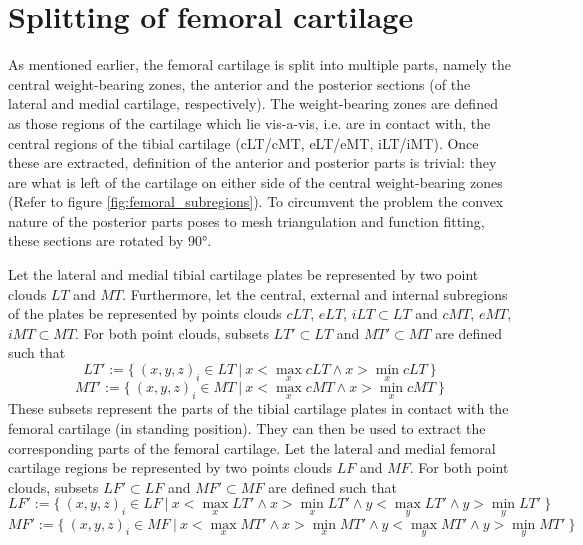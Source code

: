 \section{Splitting of femoral cartilage}
\label{sec:Splitting}
As mentioned earlier, the femoral cartilage is split into multiple parts, namely the central weight-bearing zones, the anterior and the posterior sections (of the lateral and medial cartilage, respectively). The weight-bearing zones are defined as those regions of the cartilage which lie vis-a-vis, i.e. are in contact with, the central regions of the tibial cartilage (cLT/cMT, eLT/eMT, iLT/iMT). Once these are extracted, definition of the anterior and posterior parts is trivial: they are what is left of the cartilage on either side of the central weight-bearing zones (Refer to figure \ref{fig:femoral_subregions}). To circumvent the problem the convex nature of the posterior parts poses to mesh triangulation and function fitting, these sections are rotated by 90°. 
\par\noindent
Let the lateral and medial tibial cartilage plates be represented by two point clouds $LT$ and $MT$. Furthermore, let the central, external and internal subregions of the plates be represented by points clouds $cLT$, $eLT$, $iLT \subset LT$ and $cMT$, $eMT$, $iMT \subset MT$. For both point clouds, subsets $LT' \subset LT$ and $MT' \subset MT$ are defined such that
\newline
\begin{equation}
	LT' := \{\:(x,y,z)_i \in LT \:|\: x < \max_{x} cLT \land x > \min_{x} cLT\:\}
\end{equation}
\begin{equation}
	MT' := \{\:(x,y,z)_i \in MT \:|\: x < \max_{x} cMT \land x > \min_{x} cMT\:\}
\end{equation}
\newline
These subsets represent the parts of the tibial cartilage plates in contact with the femoral cartilage (in standing position). They can then be used to extract the corresponding parts of the femoral cartilage. Let the lateral and medial femoral cartilage regions be represented by two points clouds $LF$ and $MF$. For both point clouds, subsets $LF' \subset LF$ and $MF' \subset MF$ are defined such that
\newline
\begin{equation}
	LF' := \{\:(x,y,z)_i \in LF \:|\: x < \max_{x} LT' \land x > \min_{x} LT' \land y < \max_{y} LT' \land y > \min_{y} LT'\:\}
\end{equation}
\begin{equation}
	MF' := \{\:(x,y,z)_i \in MF \:|\: x < \max_{x} MT' \land x > \min_{x} MT' \land y < \max_{y} MT' \land y > \min_{y} MT'\:\}
\end{equation}
